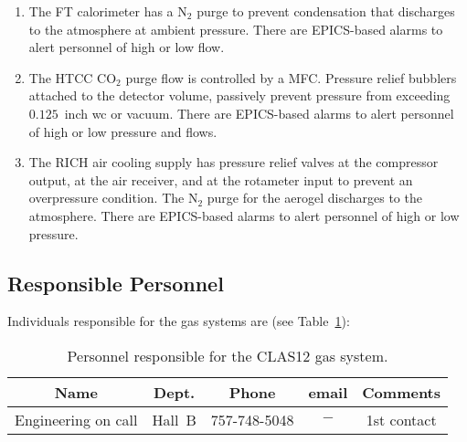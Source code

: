 \begin{enumerate}
\item The FT calorimeter has a N$_2$ purge to prevent condensation that discharges to the 
atmosphere at ambient pressure. There are EPICS-based alarms to alert personnel of high or low 
flow.

\item The HTCC CO$_2$ purge flow is controlled by a MFC. Pressure relief bubblers attached to 
the detector volume, passively prevent pressure from exceeding $0.125$~inch wc or vacuum. There 
are EPICS-based alarms to alert personnel of high or low pressure and flows.

\item The RICH air cooling supply has pressure relief valves at the compressor output, at the 
air receiver, and at the rotameter input to prevent an overpressure condition. The N$_2$ purge 
for the aerogel discharges to the atmosphere. There are EPICS-based alarms to alert personnel 
of high or low pressure.

\end{enumerate}

\subsection{Responsible Personnel}

Individuals responsible for the gas systems are (see Table~\ref{tb:gas}):

\begin{table}[!htb]
\centering
\begin{tabular}{|c|c|c|c|c|} \hline
Name & Dept. & Phone &email & Comments \\ \hline
Engineering on call & Hall~B & 757-748-5048 & $-$ & 1st contact \\ \hline
\end{tabular}
\caption{Personnel responsible for the CLAS12 gas system.} 
\label{tb:gas}
\end{table}


